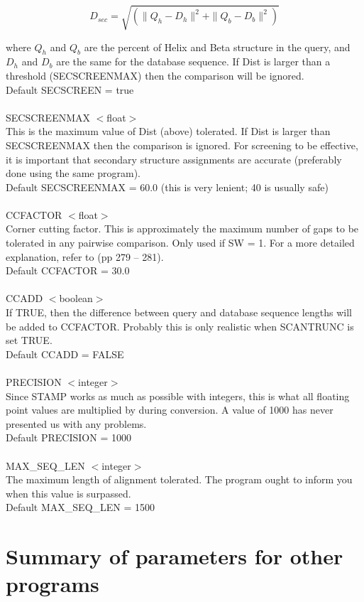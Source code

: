 \[
D_{sec} = \sqrt{(\|Q_{h} - D_{h}\|^{2} + \|Q_{b} - D_{b}\|^{2})}
\]

where $Q_{h}$ and $Q_{b}$ are the percent of Helix and Beta
structure in the query, and $D_{h}$ and $D_{b}$ are the same for the
database sequence.  If Dist is larger than a threshold
(SECSCREENMAX) then the comparison will be ignored.\\
Default SECSCREEN = true\\
\\
SECSCREENMAX $<$float$>$\\
This is the maximum value of Dist (above) tolerated.  If Dist is
larger than SECSCREENMAX then the comparison is ignored.  For
screening to be effective, it is important that secondary structure
assignments are accurate (preferably done using the same program).\\
Default SECSCREENMAX = 60.0 (this is very lenient; 40 is usually safe)\\
\\
CCFACTOR $<$float$>$\\
Corner cutting factor.  This is approximately the maximum number of
gaps to be tolerated in any pairwise comparison.  Only used if SW = 1.
For a more  detailed explanation, refer to \cite{timewarps} (pp 
279 -- 281).\\
Default CCFACTOR = 30.0\\
\\
CCADD $<$boolean$>$\\
If TRUE, then the difference between query and database sequence
lengths will be added to CCFACTOR.  Probably this is only realistic
when SCANTRUNC is set TRUE.\\
Default CCADD = FALSE\\
\\
PRECISION $<$integer$>$\\
Since STAMP works as much as possible with integers, this is what
all floating point values are multiplied by during conversion.  A
value of 1000 has never presented us with any problems.\\
Default PRECISION = 1000\\
\\
MAX\_SEQ\_LEN $<$integer$>$\\
The maximum length of alignment tolerated.  The program ought to 
inform you when this value is surpassed.\\
Default MAX\_SEQ\_LEN = 1500\\

\section{Summary of parameters for other programs}

